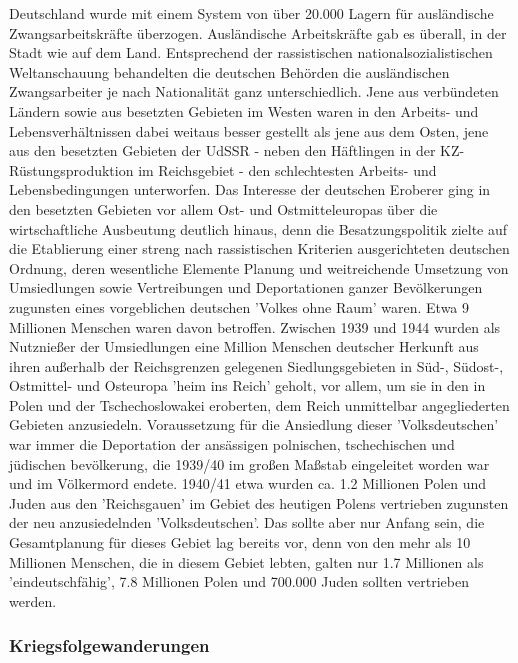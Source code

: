 \documentclass[letterpaper, 12pt]{article}
\let\tempsubsubsection\subsubsection
\renewcommand\subsubsection[1]{\vspace{0cm}\tempsubsubsection{#1}\vspace{0cm}}
\begin{document}
Deutschland wurde mit einem System von über 20.000 Lagern für ausländische Zwangsarbeitskräfte überzogen. Ausländische Arbeitskräfte gab es überall, in der Stadt wie auf dem Land. Entsprechend der rassistischen nationalsozialistischen Weltanschauung behandelten die deutschen Behörden die ausländischen Zwangsarbeiter je nach Nationalität ganz unterschiedlich. Jene aus verbündeten Ländern sowie aus besetzten Gebieten im Westen waren in den Arbeits- und Lebensverhältnissen dabei weitaus besser gestellt als jene aus dem Osten, jene aus den besetzten Gebieten der UdSSR - neben den Häftlingen in der KZ-Rüstungsproduktion im Reichsgebiet - den schlechtesten Arbeits- und Lebensbedingungen unterworfen. \clearpage
Das Interesse der deutschen Eroberer ging in den besetzten Gebieten vor allem Ost- und Ostmitteleuropas über die wirtschaftliche Ausbeutung deutlich hinaus, denn die Besatzungspolitik zielte auf die Etablierung einer streng nach rassistischen Kriterien ausgerichteten deutschen Ordnung, deren wesentliche Elemente Planung und weitreichende Umsetzung von Umsiedlungen sowie Vertreibungen und Deportationen ganzer Bevölkerungen zugunsten eines vorgeblichen deutschen 'Volkes ohne Raum' waren. Etwa 9 Millionen Menschen waren davon betroffen. Zwischen 1939 und 1944 wurden als Nutznießer der Umsiedlungen eine Million Menschen deutscher Herkunft aus ihren außerhalb der Reichsgrenzen gelegenen Siedlungsgebieten in Süd-, Südost-, Ostmittel- und Osteuropa 'heim ins Reich' geholt, vor allem, um sie in den in Polen und der Tschechoslowakei eroberten, dem Reich unmittelbar angegliederten Gebieten anzusiedeln. Voraussetzung für die Ansiedlung dieser 'Volksdeutschen' war immer die Deportation der ansässigen polnischen, tschechischen und jüdischen bevölkerung, die 1939/40 im großen Maßstab eingeleitet worden war und im Völkermord endete. 1940/41 etwa wurden ca. 1.2 Millionen Polen und Juden aus den 'Reichsgauen' im Gebiet des heutigen Polens vertrieben zugunsten der neu anzusiedelnden 'Volksdeutschen'. Das sollte aber nur Anfang sein, die Gesamtplanung für dieses Gebiet lag bereits vor, denn von den mehr als 10 Millionen Menschen, die in diesem Gebiet lebten, galten nur 1.7 Millionen als 'eindeutschfähig', 7.8 Millionen Polen und 700.000 Juden sollten vertrieben werden.

\subsubsection{Kriegsfolgewanderungen}
\end{document}
